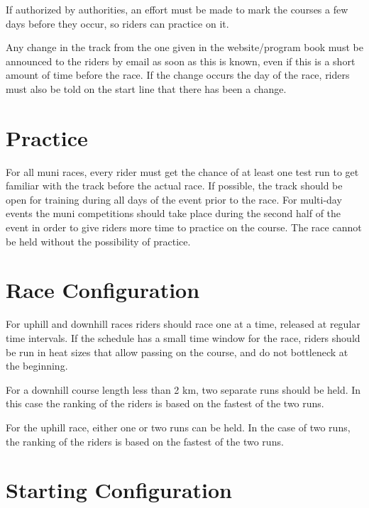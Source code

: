 If authorized by authorities, an effort must be made to mark the courses a few days before they occur, so riders can practice on it.

Any change in the track from the one given in the website/program book must be announced to the riders by email as soon as this is known, even if this is a short amount of time before the race.
If the change occurs the day of the race, riders must also be told on the start line that there has been a change.

\section{Practice}

For all muni races, every rider must get the chance of at least one test run to get familiar with the track before the actual race.
If possible, the track should be open for training during all days of the event prior to the race.
For multi-day events the muni competitions should take place during the second half of the event in order to give riders more time to practice on the course.
The race cannot be held without the possibility of practice.

\section{Race Configuration}

For uphill and downhill races riders should race one at a time, released at regular time intervals.
If the schedule has a small time window for the race, riders should be run in heat sizes that allow passing on the course, and do not bottleneck at the beginning.

For a downhill course length less than 2 km, two separate runs should be held.
In this case the ranking of the riders is based on the fastest of the two runs.

For the uphill race, either one or two runs can be held.
In the case of two runs, the ranking of the riders is based on the fastest of the two runs.

\section{Starting Configuration  \label{sec:muni_starting-configuration}}

